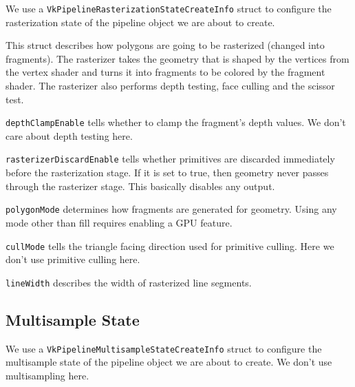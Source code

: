 We use a \texttt{VkPipelineRasterizationStateCreateInfo} struct to configure
the rasterization state of the pipeline object we are about to create.

This struct describes how polygons are going to be rasterized
(changed into fragments).
The rasterizer takes the geometry that is shaped by the vertices from the
vertex shader and turns it into fragments to be colored by the fragment shader.
The rasterizer also performs depth testing, face culling and the scissor test.

\texttt{depthClampEnable} tells whether to clamp the fragment's
depth values.
We don't care about depth testing here.

\texttt{rasterizerDiscardEnable} tells whether primitives are discarded
immediately before the rasterization stage.
If it is set to true, then geometry never passes through the rasterizer stage.
This basically disables any output.

\texttt{polygonMode} determines how fragments are generated for geometry.
Using any mode other than fill requires enabling a GPU feature.

\texttt{cullMode} tells the triangle facing direction used for primitive culling.
Here we don't use primitive culling here.

\texttt{lineWidth} describes the width of rasterized line segments.

\begin{minipage}{\linewidth}{\noindent}
    
\end{minipage}

\subsection{Multisample State}

We use a \texttt{VkPipelineMultisampleStateCreateInfo} struct to configure
the multisample state of the pipeline object we are about to create.
We don't use multisampling here.

\begin{minipage}{\linewidth}{\noindent}
    
\end{minipage}

